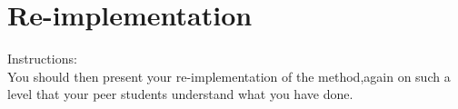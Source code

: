 \section{Re-implementation}
Instructions:\\
You should then present your re-implementation of the method,again on such a level that your peer students understand what you have done.